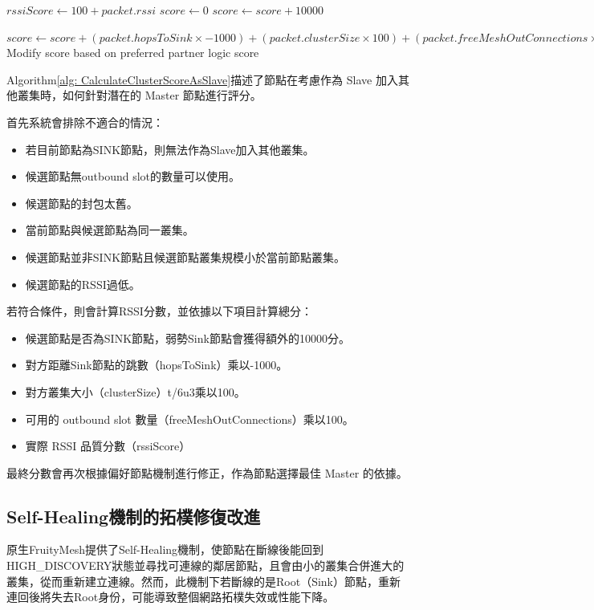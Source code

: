 \begin{ZhChapter}
\begin{algorithm}[H]
\begin{algorithmic}[1]
\State $rssiScore \gets 100 + packet.rssi$
\State $score \gets 0$
    \State $score \gets score + 10000$
\EndIf

\State $score \gets score + (packet.hopsToSink \times -1000) + (packet.clusterSize \times 100) + (packet.freeMeshOutConnections \times 100) + rssiScore$
\State Modify score based on preferred partner logic
\State \Return score
\end{algorithmic}
\end{algorithm}

Algorithm\ref{alg: CalculateClusterScoreAsSlave}描述了節點在考慮作為 Slave 加入其他叢集時，如何針對潛在的 Master 節點進行評分。

首先系統會排除不適合的情況：
\begin{itemize}
    \item 若目前節點為SINK節點，則無法作為Slave加入其他叢集。
    \item 候選節點無outbound slot的數量可以使用。
    \item 候選節點的封包太舊。
    \item 當前節點與候選節點為同一叢集。
    \item 候選節點並非SINK節點且候選節點叢集規模小於當前節點叢集。
    \item 候選節點的RSSI過低。
\end{itemize}

若符合條件，則會計算RSSI分數，並依據以下項目計算總分：

\begin{itemize}
    \item 候選節點是否為SINK節點，弱勢Sink節點會獲得額外的10000分。
    \item 對方距離Sink節點的跳數（hopsToSink）乘以-1000。
    \item 對方叢集大小（clusterSize）t/6u3乘以100。
    \item 可用的 outbound slot 數量（freeMeshOutConnections）乘以100。
    \item 實際 RSSI 品質分數（rssiScore）
\end{itemize}

最終分數會再次根據偏好節點機制進行修正，作為節點選擇最佳 Master 的依據。


\subsection{Self-Healing機制的拓樸修復改進}

原生FruityMesh提供了Self-Healing機制，使節點在斷線後能回到HIGH\_DISCOVERY狀態並尋找可連線的鄰居節點，且會由小的叢集合併進大的叢集，從而重新建立連線。然而，此機制下若斷線的是Root（Sink）節點，重新連回後將失去Root身份，可能導致整個網路拓樸失效或性能下降。


\end{ZhChapter}
